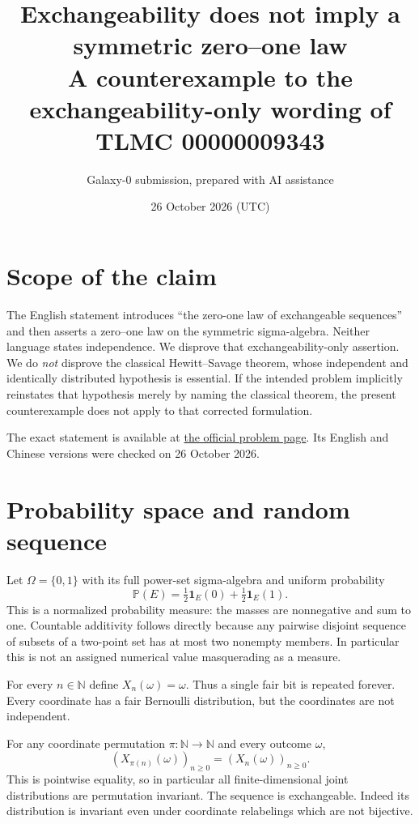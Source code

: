 \documentclass[11pt]{article}
\title{Exchangeability does not imply a symmetric zero--one law\\\large A counterexample to the exchangeability-only wording of TLMC 00000009343}
\author{Galaxy-0 submission, prepared with AI assistance}
\date{26 October 2026 (UTC)}
\begin{document}
\maketitle
\section{Scope of the claim}
The English statement introduces ``the zero-one law of exchangeable sequences'' and then asserts a zero--one law on the symmetric sigma-algebra. Neither language states independence. We disprove that exchangeability-only assertion. We do \emph{not} disprove the classical Hewitt--Savage theorem, whose independent and identically distributed hypothesis is essential. If the intended problem implicitly reinstates that hypothesis merely by naming the classical theorem, the present counterexample does not apply to that corrected formulation.

The exact statement is available at
\href{https://github.com/The-Last-Math-Competition/The-Last-Math-Competition/blob/main/conjectures/00000009343.md}{the official problem page}.
Its English and Chinese versions were checked on 26 October 2026.

\section{Probability space and random sequence}
Let $\Omega=\{0,1\}$ with its full power-set sigma-algebra and uniform probability
\[
 \mathbb P(E)=\tfrac12\mathbf1_E(0)+\tfrac12\mathbf1_E(1).
\]
This is a normalized probability measure: the masses are nonnegative and sum to one. Countable additivity follows directly because any pairwise disjoint sequence of subsets of a two-point set has at most two nonempty members. In particular this is not an assigned numerical value masquerading as a measure.

For every $n\in\mathbb N$ define $X_n(\omega)=\omega$. Thus a single fair bit is repeated forever. Every coordinate has a fair Bernoulli distribution, but the coordinates are not independent.

For any coordinate permutation $\pi:\mathbb N\to\mathbb N$ and every outcome $\omega$,
\[
 (X_{\pi(n)}(\omega))_{n\geq0}=(X_n(\omega))_{n\geq0}.
\]
This is pointwise equality, so in particular all finite-dimensional joint distributions are permutation invariant. The sequence is exchangeable. Indeed its distribution is invariant even under coordinate relabelings which are not bijective.
\end{document}
